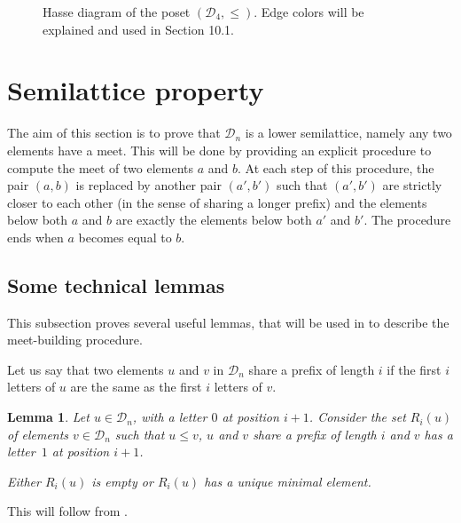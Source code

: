 \documentclass[10pt]{article}
\newtheorem{lemma}[lemma]{Lemma}
\theoremstyle{definition}
\newcommand{\Dyck}{\mathscr{D}}
\begin{document}
\begin{figure}[htb]
  \caption{Hasse diagram of the poset $(\Dyck_4, \leq)$. Edge colors will be explained and used in Section 10.1.}
  \label{fig_dyck4}
\end{figure}

\clearpage\setcounter{section}{6}\setcounter{theorem}{0}\setcounter{equation}{15}\setcounter{figure}{8}
\section{Semilattice property}

\label{section-semilattice}

The aim of this section is to prove that $\Dyck_n$ is a lower
semilattice, namely any two elements have a meet. This will be done by
providing an explicit procedure to compute the meet of two elements
$a$ and $b$. At each step of this procedure, the pair $(a,b)$ is
replaced by another pair $(a',b')$ such that $(a',b')$ are strictly closer to
each other (in the sense of sharing a longer prefix) and the elements below both $a$ and $b$ are
exactly the elements below both $a'$ and $b'$. The procedure ends when $a$
becomes equal to $b$.

\subsection{Some technical lemmas}

This subsection proves several useful lemmas, that will be used in
 to describe the meet-building procedure.

Let us say that two elements $u$ and $v$ in $\Dyck_n$ share a prefix
of length $i$ if the first $i$ letters of $u$ are the same as the
first $i$ letters of $v$.

\begin{lemma}
  \label{forcer_un}
  Let $u \in \Dyck_n$, with a letter $0$ at position $i+1$. Consider
  the set $R_i(u)$ of elements $v \in \Dyck_n$ such that $u \leq v$,
  $u$ and $v$ share a prefix of length $i$ and $v$ has a letter~$1$ at
  position $i+1$.

  Either $R_i(u)$ is empty or $R_i(u)$ has a unique minimal element.
\end{lemma}
This will follow from .
\end{document}
